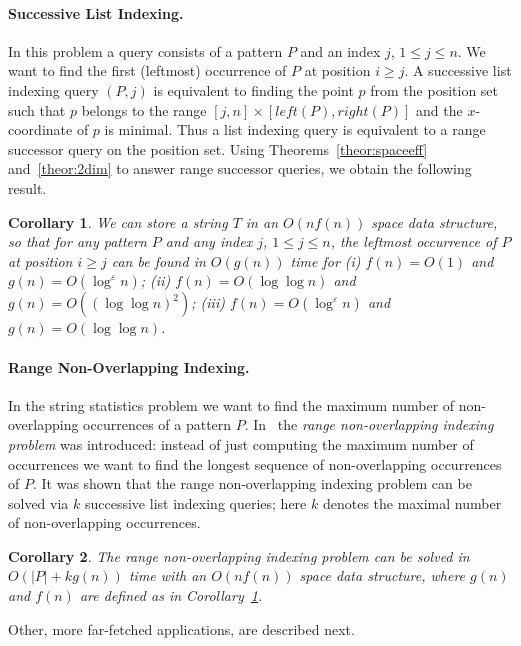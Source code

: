 \documentclass[11pt]{article}
\newtheorem{corollary}{Corollary}
\newcommand{\eps}{\varepsilon}
\begin{document}
\paragraph{Successive List Indexing.}
In this problem a query consists of a pattern $P$ 
and an index $j$, $1\le j\le n$. We want to find the first (leftmost) 
occurrence of $P$  at position $i\ge j$. 
A successive list indexing query $(P,j)$ is equivalent to finding the 
point $p$ from the position set such that $p$ belongs to the range  $[j,n]\times [left(P),right(P)]$ and the $x$-coordinate of $p$ is minimal. 
Thus a list indexing query is equivalent to a range successor query on 
the position set. Using Theorems~\ref{theor:spaceeff} and~\ref{theor:2dim} 
to answer range successor queries, we obtain the following result.
\begin{corollary}\label{cor:succind}
We can store a string $T$ in an $O(nf(n))$ space data structure, so that 
for any pattern $P$ and any index $j$, $1\le j\le n$, the leftmost 
occurrence of $P$ at position $i\ge j$ can be found in $O(g(n))$ time 
for 
 (i) $f(n)=O(1)$ and $g(n)=O(\log^{\eps}n)$;
(ii) $f(n)=O(\log\log n)$ and $g(n)=O((\log \log n)^2)$;
(iii) $f(n)=O(\log^{\eps}n)$ and $g(n)=O(\log \log n)$.
\end{corollary}

\paragraph{Range Non-Overlapping Indexing.}
In the string statistics problem we want to find the maximum number of non-overlapping occurrences of a pattern $P$. In~\cite{KKL07wads} the 
\emph{range non-overlapping indexing problem} was introduced: 
instead of just computing the maximum number of occurrences 
we want to find the longest sequence of non-overlapping occurrences of $P$.
It was shown \cite{KKL07wads} that the range non-overlapping 
indexing problem can be solved via $k$ successive list indexing 
queries; here $k$ denotes the maximal number of non-overlapping occurrences. 

\begin{corollary}\label{cor:rangenon}
The range non-overlapping indexing problem can be solved  in $O(|P|+kg(n))$ time with an $O(n f(n))$ space data structure, where $g(n)$ and $f(n)$ 
are defined as in Corollary~\ref{cor:succind}.
\end{corollary}

Other, more far-fetched applications, are described next.
\end{document}
